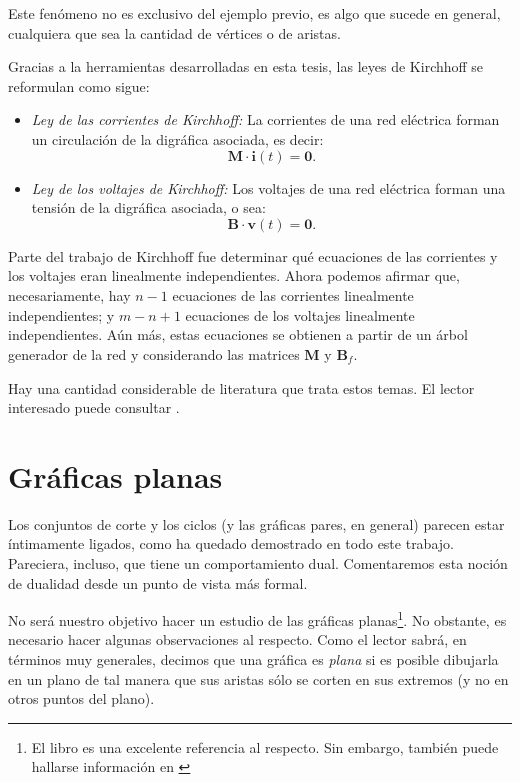 Este fenómeno no es exclusivo del ejemplo previo, es algo que sucede en general, cualquiera que sea la cantidad de vértices o de aristas.

Gracias a la herramientas desarrolladas en esta tesis, las leyes de Kirchhoff se reformulan como sigue:

\begin{itemize}
    \item \textit{Ley de las corrientes de Kirchhoff:} La corrientes de una red eléctrica forman un circulación de la digráfica asociada, es decir: $$
    \mathbf{M}\cdot\mathbf{i}(t) = \mathbf{0}.$$
    
    \item \textit{Ley de los voltajes de Kirchhoff:} Los voltajes de una red eléctrica forman una tensión de la digráfica asociada, o sea: $$
    \mathbf{B}\cdot\mathbf{v}(t) = \mathbf{0}.$$
\end{itemize}


Parte del trabajo de Kirchhoff fue determinar qué ecuaciones de las corrientes y los voltajes eran linealmente independientes. Ahora podemos afirmar que, necesariamente, hay $n-1$ ecuaciones de las corrientes linealmente independientes; y $m -n +1$ ecuaciones de los voltajes linealmente independientes. Aún más, estas ecuaciones se obtienen a partir de un árbol generador de la red y considerando las matrices $\widehat{\mathbf{M}}$ y $\mathbf{B}_{f}$. 

Hay una cantidad considerable de literatura que trata estos temas. El lector interesado puede consultar \cite{Deo,Seshu,Slepian,Chen}.

\section{Gráficas planas}

Los conjuntos de corte y los ciclos (y las gráficas pares, en general) parecen estar íntimamente ligados, como ha quedado demostrado en todo este trabajo. Pareciera, incluso, que tiene un comportamiento dual. Comentaremos esta noción de dualidad desde un punto de vista más formal.

No será nuestro objetivo hacer un estudio de las gráficas planas\footnote{El libro \cite{Bondy} es una excelente referencia al respecto. Sin embargo, también puede hallarse información en \cite{Chen,Deo,Diestel,Seshu,Gross}}. No obstante, es necesario hacer algunas observaciones al respecto. Como el lector sabrá, en términos muy generales, decimos que una gráfica es \textit{plana} si es posible dibujarla en un plano de tal manera que sus aristas sólo se corten en sus extremos (y no en otros puntos del plano).

